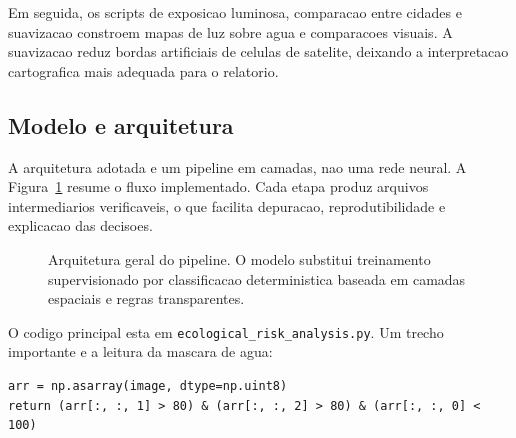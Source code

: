 \documentclass[12pt]{article}
\begin{document}
Em seguida, os scripts de exposicao luminosa, comparacao entre cidades e suavizacao constroem mapas de luz sobre agua e comparacoes visuais. A suavizacao reduz bordas artificiais de celulas de satelite, deixando a interpretacao cartografica mais adequada para o relatorio.

\subsection{Modelo e arquitetura}

A arquitetura adotada e um pipeline em camadas, nao uma rede neural. A Figura~\ref{fig:architecture} resume o fluxo implementado. Cada etapa produz arquivos intermediarios verificaveis, o que facilita depuracao, reprodutibilidade e explicacao das decisoes.

\begin{figure}[ht]
\centering
{}
\caption{Arquitetura geral do pipeline. O modelo substitui treinamento supervisionado por classificacao deterministica baseada em camadas espaciais e regras transparentes.}
\label{fig:architecture}
\end{figure}

O codigo principal esta em \texttt{ecological\_risk\_analysis.py}. Um trecho importante e a leitura da mascara de agua:

\begin{verbatim}
arr = np.asarray(image, dtype=np.uint8)
return (arr[:, :, 1] > 80) & (arr[:, :, 2] > 80) & (arr[:, :, 0] < 100)
\end{verbatim}
\end{document}
